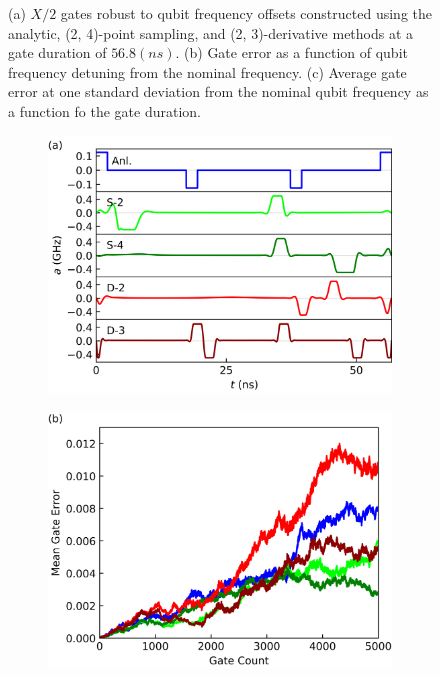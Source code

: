 \documentclass[
  amsfonts,
  amsmath,
  tbtags,
  amssymb,
  aps,
  nobibnotes,
  twocolumn,
]{revtex4-2}
\begin{document}
\begin{figure}[ht]
  \caption{\centering (a) $X/2$ gates robust to qubit frequency offsets
    constructed using the analytic, (2, 4)-point
    sampling, and (2, 3)-derivative methods at a gate duration of $56.8 (ns)$.
    (b) Gate error as a function of qubit frequency detuning from the nominal frequency.
    (c) Average gate error at one standard deviation from the nominal qubit frequency as
    a function fo the gate duration.
  }
\end{figure}

\begin{figure}[ht]
  \begin{subfigure}{\linewidth}
    \includegraphics[width=\linewidth]{assets/f3a.png}
  \end{subfigure}
  
  \begin{subfigure}{\linewidth}
    \includegraphics[width=\linewidth]{assets/f3b.png}
  \end{subfigure}


\end{figure}
\end{document}
